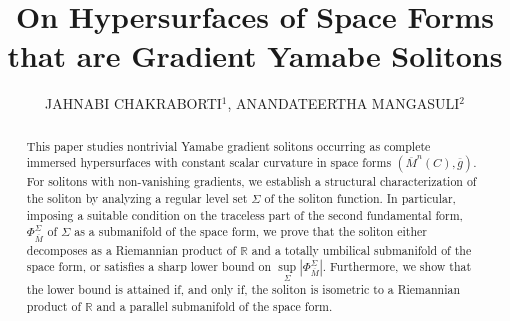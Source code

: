 \documentclass[11pt]{amsart}
\title{On Hypersurfaces of Space Forms that are Gradient Yamabe Solitons}
\author{JAHNABI CHAKRABORTI$^1$, ANANDATEERTHA MANGASULI$^2$}
\date{}
\date{}
\numberwithin{equation}{section}
\begin{document}
\begin{abstract}
    This paper studies nontrivial Yamabe gradient solitons occurring as complete immersed hypersurfaces with constant scalar curvature in space forms $\left(\overline{M}^n(C), \overline{g}\right)$. For solitons with non-vanishing gradients, we establish a structural characterization of the soliton by analyzing a regular level set $\Sigma$ of the soliton function. In particular, imposing a suitable condition on the traceless part of the second fundamental form, $\Phi^{\Sigma}_{\overline{M}}$ of $\Sigma$ as a submanifold of the space form, we prove that the soliton either decomposes as a Riemannian product of $\mathbb{R}$ and a totally umbilical submanifold of the space form, or satisfies a sharp lower bound on $\sup\limits_\Sigma\left|\Phi^{\Sigma}_{\overline{M}}\right|$. Furthermore, we show that the lower bound is attained if, and only if, the soliton is isometric to a Riemannian product of $\mathbb{R}$ and a parallel submanifold of the space form.
\end{abstract}
\maketitle
\end{document}
